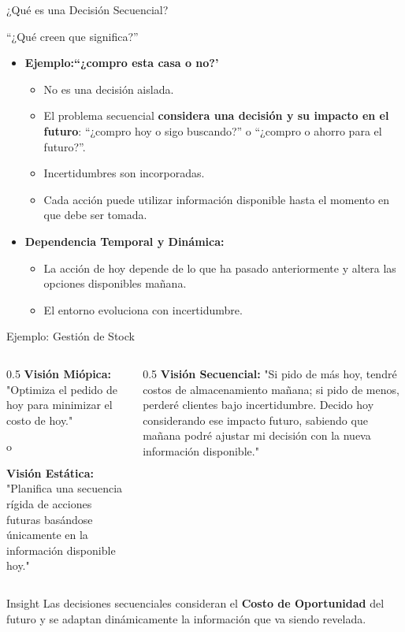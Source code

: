 \documentclass[xcolor=dvipsnames]{beamer}
\begin{document}
\begin{frame}{¿Qué es una Decisión Secuencial?}
\begin{center}
    \Large ``¿Qué creen que significa?''
\end{center}
\pause


    \begin{itemize}
        \item \textbf{Ejemplo:``¿compro esta casa o no?' } 
        \begin{itemize}
            \small
            \item<3-> No es una decisión aislada.
            \item<4-> El problema secuencial \textbf{considera una decisi\'on y su impacto en el futuro}: ``¿compro hoy o sigo buscando?'' o ``¿compro o ahorro para el futuro?''.
	  \item<5-> Incertidumbres son incorporadas.
	  \item<6-> Cada acci\'on puede utilizar informaci\'on disponible hasta el momento en que debe ser tomada.
        \end{itemize}
        
        \item<7-> \textbf{Dependencia Temporal y Dinámica:} 
        \begin{itemize}
            \small
            \item La acción de hoy depende de lo que ha pasado anteriormente y altera las opciones disponibles mañana.
            \item El entorno evoluciona con incertidumbre.
        \end{itemize}
    \end{itemize}

\end{frame}

\begin{frame}{Ejemplo: Gesti\'on de Stock}
\begin{columns}
\begin{column}{0.5\textwidth}
\textbf{Visión Mi\'opica:}
"{}Optimiza el pedido de hoy para minimizar el costo de hoy."

o 

\textbf{Visión Est\'atica:}
"{}Planifica una secuencia rígida de acciones futuras basándose únicamente en la información disponible hoy."
\end{column}
\begin{column}{0.5\textwidth}
\textbf{Visión Secuencial:}
"{}Si pido de más hoy, tendré costos de almacenamiento mañana; si pido de menos, perderé clientes bajo incertidumbre. Decido hoy considerando ese impacto futuro, sabiendo que mañana podré ajustar mi decisión con la nueva información disponible."
\end{column}
\end{columns}
\vspace{0.5cm}
\begin{block}{Insight}
Las decisiones secuenciales consideran el \textbf{Costo de Oportunidad} del futuro y se adaptan din\'amicamente   la informaci\'on que va siendo revelada.
\end{block}
\end{frame}
\end{document}
